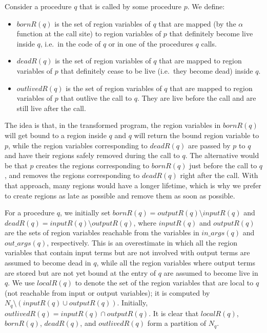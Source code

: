 \documentclass{tlp}
\newcommand{\inargs}[1]{\ensuremath{\mathit{in\_args}(#1)}}
\newcommand{\outargs}[1]{\ensuremath{\mathit{out\_args}(#1)}}
\newcommand{\bornR}[1]{\ensuremath{{bornR}(#1)}}
\newcommand{\deadR}[1]{\ensuremath{{deadR}(#1)}}
\newcommand{\localR}[1]{\ensuremath{{localR}(#1)}}
\newcommand{\inputR}[1]{\ensuremath{{inputR}(#1)}}
\newcommand{\outputR}[1]{\ensuremath{{outputR}(#1)}}
\newcommand{\outlivedR}[1]{\ensuremath{{outlivedR}(#1)}}
\begin{document}
Consider a procedure $q$ that is called by some procedure $p$.
We define:
\begin{itemize}
    \item \bornR{q} is the set of region variables of $q$
    that are mapped (by the $\alpha$ function at the call site) to
    region variables of $p$ that definitely become live inside $q$,
    i.e.\ in the code of $q$ or in one of the procedures $q$ calls.
    \item \deadR{q} is the set of region variables of $q$
    that are mapped to region variables of $p$
    that definitely cease to be live (i.e.\ they become dead) inside $q$.
    \item \outlivedR{q} is the set of region variables of $q$
    that are mapped to region variables of $p$ that outlive the call to $q$.
    They are live before the call and are still live after the call.
\end{itemize}
The idea is that, in the transformed program,
the region variables in \bornR{q}
will get bound to a region inside $q$
and $q$ will return the bound region variable to $p$, while
the region variables corresponding to \deadR{q} are passed by $p$ to $q$
and have their regions safely removed during the call to $q$.
The alternative would be that
$p$ creates the regions corresponding to \bornR{q} just before the call to $q$,
and removes the regions corresponding to \deadR{q} right after the call.
With that approach, many regions would have a longer lifetime,
which is why we prefer to create regions as late as possible
and remove them as soon as possible.

For a procedure $q$, we initially set
$\bornR{q} = \outputR{q} \setminus \inputR{q}$ and
$\deadR{q} = \inputR{q} \setminus \outputR{q}$,
where \inputR{q} and \outputR{q} are
the sets of region variables reachable from the variables in
\inargs{q} and \outargs{q}, respectively.
This is an overestimate in which
all the region variables that contain input terms
but are not involved with output terms
are assumed to become dead in $q$,
while all the region variables where output terms are stored
but are not yet bound at the entry of $q$
are assumed to become live in $q$.
We use \localR{q} to denote
the set of the region variables that are local to $q$
(not reachable from input or output variables);
it is computed by $N_q \setminus (\inputR{q} \cup \outputR{q})$.
Initially, $\outlivedR{q} = \inputR{q} \cap \outputR{q}$.
It is clear that \localR{q}, \bornR{q}, \deadR{q}, and \outlivedR{q}
form a partition of $N_q$.
\end{document}

